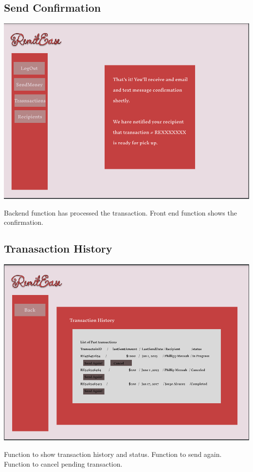 \documentclass[onecolumn, letterpaper, ]{report}
\begin{document}
    \begin{landscape}
        \subsection{Send Confirmation}
        \includegraphics[width=.97\linewidth]{MockUps/SendConfirmation.PNG}
        
        Backend function has processed the transaction. Front end function shows the confirmation.

    \end{landscape}

    \begin{landscape}
        \subsection{Tranasaction History}
        \includegraphics[width=.97\linewidth]{MockUps/TransactionHist.PNG}

       Function to show transaction history and status. Function to send again. Function to cancel pending transaction.
    \end{landscape}
    
\end{document}
